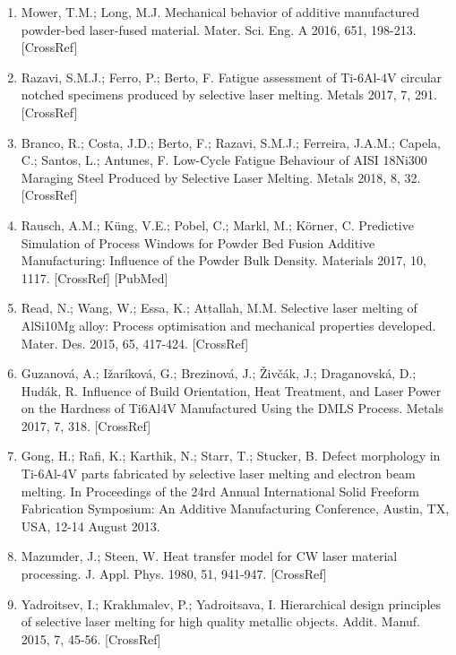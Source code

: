 \documentclass[10pt]{article}
\begin{document}
\begin{enumerate}
  \item Mower, T.M.; Long, M.J. Mechanical behavior of additive manufactured powder-bed laser-fused material. Mater. Sci. Eng. A 2016, 651, 198-213. [CrossRef]

  \item Razavi, S.M.J.; Ferro, P.; Berto, F. Fatigue assessment of Ti-6Al-4V circular notched specimens produced by selective laser melting. Metals 2017, 7, 291. [CrossRef]

  \item Branco, R.; Costa, J.D.; Berto, F.; Razavi, S.M.J.; Ferreira, J.A.M.; Capela, C.; Santos, L.; Antunes, F. Low-Cycle Fatigue Behaviour of AISI 18Ni300 Maraging Steel Produced by Selective Laser Melting. Metals 2018, 8, 32. [CrossRef]

  \item Rausch, A.M.; Küng, V.E.; Pobel, C.; Markl, M.; Körner, C. Predictive Simulation of Process Windows for Powder Bed Fusion Additive Manufacturing: Influence of the Powder Bulk Density. Materials 2017, 10, 1117. [CrossRef] [PubMed]

  \item Read, N.; Wang, W.; Essa, K.; Attallah, M.M. Selective laser melting of AlSi10Mg alloy: Process optimisation and mechanical properties developed. Mater. Des. 2015, 65, 417-424. [CrossRef]

  \item Guzanová, A.; Ižaríková, G.; Brezinová, J.; Živčák, J.; Draganovská, D.; Hudák, R. Influence of Build Orientation, Heat Treatment, and Laser Power on the Hardness of Ti6Al4V Manufactured Using the DMLS Process. Metals 2017, 7, 318. [CrossRef]

  \item Gong, H.; Rafi, K.; Karthik, N.; Starr, T.; Stucker, B. Defect morphology in Ti-6Al-4V parts fabricated by selective laser melting and electron beam melting. In Proceedings of the 24rd Annual International Solid Freeform Fabrication Symposium: An Additive Manufacturing Conference, Austin, TX, USA, 12-14 August 2013.

  \item Mazumder, J.; Steen, W. Heat transfer model for CW laser material processing. J. Appl. Phys. 1980, 51, 941-947. [CrossRef]

  \item Yadroitsev, I.; Krakhmalev, P.; Yadroitsava, I. Hierarchical design principles of selective laser melting for high quality metallic objects. Addit. Manuf. 2015, 7, 45-56. [CrossRef]


\end{enumerate}
\end{document}
